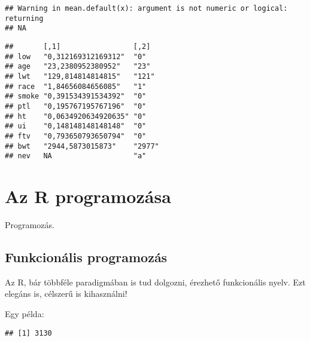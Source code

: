 \documentclass[]{book}
\newenvironment{Shaded}{\begin{snugshade}}{\end{snugshade}}
\newcommand{\KeywordTok}[1]{\textcolor[rgb]{0.13,0.29,0.53}{\textbf{#1}}}
\newcommand{\DecValTok}[1]{\textcolor[rgb]{0.00,0.00,0.81}{#1}}
\newcommand{\StringTok}[1]{\textcolor[rgb]{0.31,0.60,0.02}{#1}}
\newcommand{\ControlFlowTok}[1]{\textcolor[rgb]{0.13,0.29,0.53}{\textbf{#1}}}
\newcommand{\OperatorTok}[1]{\textcolor[rgb]{0.81,0.36,0.00}{\textbf{#1}}}
\newcommand{\NormalTok}[1]{#1}
\begin{document}
\begin{verbatim}
## Warning in mean.default(x): argument is not numeric or logical: returning
## NA
\end{verbatim}

\begin{verbatim}
##       [,1]                 [,2]  
## low   "0,312169312169312"  "0"   
## age   "23,2380952380952"   "23"  
## lwt   "129,814814814815"   "121" 
## race  "1,84656084656085"   "1"   
## smoke "0,391534391534392"  "0"   
## ptl   "0,195767195767196"  "0"   
## ht    "0,0634920634920635" "0"   
## ui    "0,148148148148148"  "0"   
## ftv   "0,793650793650794"  "0"   
## bwt   "2944,5873015873"    "2977"
## nev   NA                   "a"
\end{verbatim}

\chapter{Az R programozása}\label{az-r-programozasa}

Programozás.

\section{Funkcionális programozás}\label{funkcionalis-programozas}

Az R, bár többféle paradigmában is tud dolgozni, érezhető funkcionális
nyelv. Ezt elegáns is, célszerű is kihasználni!

Egy példa:

\begin{Shaded}
\end{Shaded}

\begin{verbatim}
## [1] 3130
\end{verbatim}

\begin{Shaded}
\end{Shaded}
\end{document}
